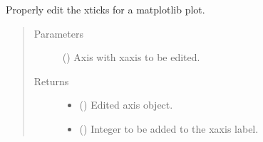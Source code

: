 \documentclass[letterpaper,10pt,english]{sphinxmanual}
\begin{document}
\begin{fulllineitems}
\label{\detokenize{tes:tes.traces.correct_xticks}}
\sphinxAtStartPar
Properly edit the xticks for a matplotlib plot.
\begin{quote}\begin{description}
\item[{Parameters}] \leavevmode
\sphinxAtStartPar
{} () \textendash{} Axis with x\sphinxhyphen{}axis to be edited.

\item[{Returns}] \leavevmode
\sphinxAtStartPar
\begin{itemize}
\item {} 
\sphinxAtStartPar
{} () \textendash{} Edited axis object.

\item {} 
\sphinxAtStartPar
{} () \textendash{} Integer to be added to the x\sphinxhyphen{}axis label.

\end{itemize}


\end{description}\end{quote}

\end{fulllineitems}

\end{document}
